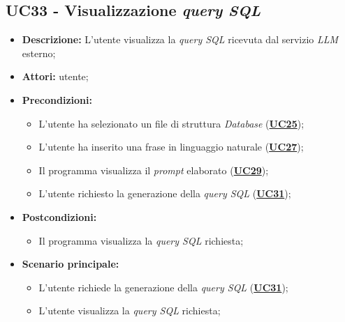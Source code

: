 \subsection{UC33 - Visualizzazione \textit{query SQL}}
\label{sec:UC33}
\begin{itemize}
	\item \textbf{Descrizione:} L’utente visualizza la \textit{query SQL} ricevuta dal servizio \textit{LLM} esterno;
	\item \textbf{Attori:} utente;
	\item \textbf{Precondizioni:} 
	\begin{itemize}
		\item L’utente ha selezionato un file di struttura \textit{Database} (\hyperref[sec:UC25]{\textbf{UC25}});
		\item L’utente ha inserito una frase in linguaggio naturale (\hyperref[sec:UC27]{\textbf{UC27}});
		\item Il programma visualizza il \textit{prompt} elaborato (\hyperref[sec:UC29]{\textbf{UC29}});
		\item L’utente richiesto la generazione della \textit{query SQL} (\hyperref[sec:UC31]{\textbf{UC31}});
	\end{itemize}
	\item \textbf{Postcondizioni:} 
	\begin{itemize}
		\item Il programma visualizza la \textit{query SQL} richiesta;
	\end{itemize}
	\item \textbf{Scenario principale:} 
	\begin{itemize}
		\item L'utente richiede la generazione della \textit{query SQL} (\hyperref[sec:UC31]{\textbf{UC31}});
		\item L'utente visualizza la \textit{query SQL} richiesta;
	\end{itemize}
\end{itemize}
